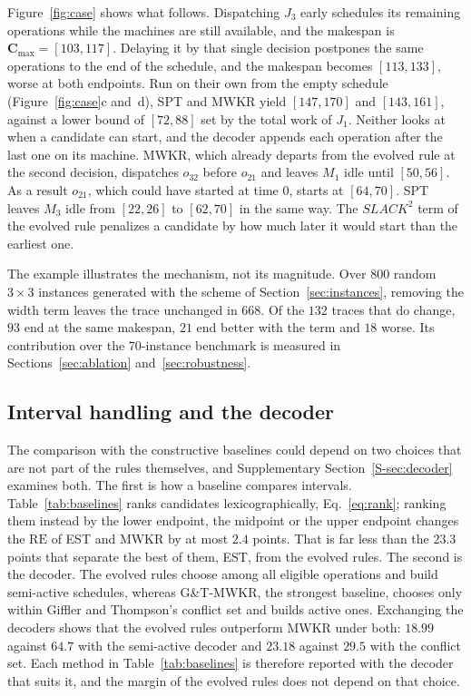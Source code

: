 \documentclass[preprint,number,sort&compress,12pt]{elsarticle}
\newcommand{\RE}{\mathrm{RE}}
\begin{document}
Figure~\ref{fig:case} shows what follows. Dispatching $J_3$ early schedules its remaining operations
while the machines are still available, and the makespan is
$\mathbf{C}_{\max} = [103,117]$. Delaying it by that single decision
postpones the same operations to the end of the schedule, and the
makespan becomes $[113,133]$, worse at both endpoints. Run on their own
from the empty schedule (Figure~\ref{fig:case}c and~d), SPT and MWKR
yield $[147,170]$ and $[143,161]$, against a lower bound of $[72,88]$
set by the total work of $J_1$. Neither looks at when a candidate can
start, and the decoder appends each operation after the last one on its
machine. MWKR, which already departs from the evolved rule at the second
decision, dispatches $o_{32}$ before $o_{21}$ and leaves $M_1$ idle until
$[50,56]$. As a result $o_{21}$, which could have started at time $0$,
starts at $[64,70]$. SPT leaves $M_3$ idle from $[22,26]$ to $[62,70]$
in the same way. The $\mathit{SLACK}^2$ term of the evolved rule penalizes a candidate by how much later it would start than the earliest one.

The example illustrates the mechanism, not its magnitude. Over $800$
random $3{\times}3$ instances generated with the scheme of
Section~\ref{sec:instances}, removing the width term leaves the trace
unchanged in $668$. Of the $132$ traces that do change, $93$ end at the
same makespan, $21$ end better with the term and $18$ worse. Its
contribution over the 70-instance benchmark is measured in
Sections~\ref{sec:ablation} and~\ref{sec:robustness}.

\subsection{Interval handling and the decoder}
\label{sec:decoder}

The comparison with the constructive baselines could depend on two
choices that are not part of the rules themselves, and Supplementary
Section~\ref{S-sec:decoder} examines both. The first is how a baseline
compares intervals. Table~\ref{tab:baselines} ranks candidates
lexicographically, Eq.~\eqref{eq:rank}; ranking them instead by the
lower endpoint, the midpoint or the upper endpoint changes the $\RE$ of
EST and MWKR by at most $2.4$ points. That is far less than the $23.3$
points that separate the best of them, EST, from the evolved rules. The second
is the decoder. The evolved rules choose among all eligible operations
and build semi-active schedules, whereas G\&T-MWKR, the strongest
baseline, chooses only within Giffler and Thompson's conflict set and
builds active ones. Exchanging the decoders shows that the evolved rules
outperform MWKR under both: $18.99$ against $64.7$ with the semi-active
decoder and $23.18$ against $29.5$ with the conflict set. Each method in
Table~\ref{tab:baselines} is therefore reported with the decoder that
suits it, and the margin of the evolved rules does not depend on that
choice.
\end{document}
